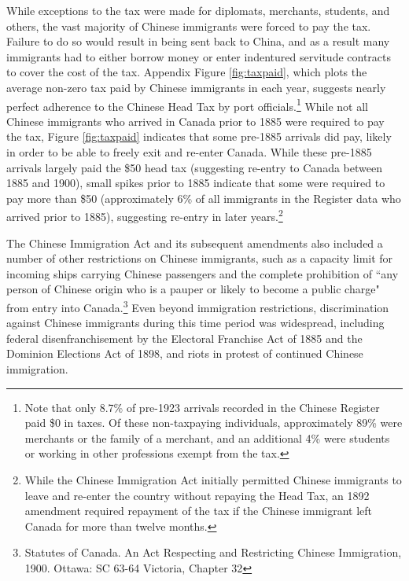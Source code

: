 While exceptions to the tax were made for diplomats, merchants, students, and others, the vast majority of Chinese immigrants were forced to pay the tax. Failure to do so would result in being sent back to China, and as a result many immigrants had to either borrow money or enter indentured servitude contracts to cover the cost of the tax. Appendix Figure \ref{fig:taxpaid}, which plots the average non-zero tax paid by Chinese immigrants in each year, suggests nearly perfect adherence to the Chinese Head Tax by port officials.\footnote{Note that only 8.7\% of pre-1923 arrivals recorded in the Chinese Register paid \$0 in taxes. Of these non-taxpaying individuals, approximately 89\% were merchants or the family of a merchant, and an additional 4\% were students or working in other professions exempt from the tax.} 
While not all Chinese immigrants who arrived in Canada prior to 1885 were required to pay the tax, Figure \ref{fig:taxpaid} indicates that some pre-1885 arrivals did pay, likely in order to be able to freely exit and re-enter Canada. While these pre-1885 arrivals largely paid the \$50 head tax (suggesting re-entry to Canada between 1885 and 1900), small spikes prior to 1885 indicate that some were required to pay more than \$50 (approximately 6\% of all immigrants in the Register data who arrived prior to 1885), suggesting re-entry in later years.\footnote{While the Chinese Immigration Act initially permitted Chinese immigrants to leave and re-enter the country without repaying the Head Tax, an 1892 amendment required repayment of the tax if the Chinese immigrant left Canada for more than twelve months.} 

The Chinese Immigration Act and its subsequent amendments also included a number of other restrictions on Chinese immigrants, such as a capacity limit for incoming ships carrying Chinese passengers and the complete prohibition of ``any person of Chinese origin who is a pauper or likely to become a public charge" from entry into Canada.\footnote{Statutes of Canada. An Act Respecting and Restricting Chinese Immigration, 1900. Ottawa: SC 63-64 Victoria, Chapter 32  }
Even beyond immigration restrictions, discrimination against Chinese immigrants during this time period was widespread, including federal disenfranchisement by the Electoral Franchise Act of 1885 and the Dominion Elections Act of 1898, and riots in protest of continued Chinese immigration.

